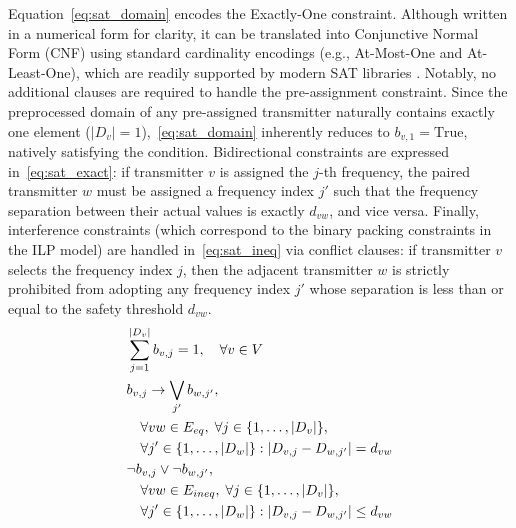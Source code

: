 \documentclass[letterpaper,journal]{IEEEtran}
\begin{document}
Equation~\eqref{eq:sat_domain} encodes the Exactly-One constraint. Although written in a numerical form for clarity, it can be translated into Conjunctive Normal Form (CNF) using standard cardinality encodings (e.g., At-Most-One and At-Least-One), which are readily supported by modern SAT libraries \cite{imms-sat18, itk-sat24}.
Notably, no additional clauses are required to handle the pre-assignment constraint. Since the preprocessed domain of any pre-assigned transmitter naturally contains exactly one element ($|D_v| = 1$),~\eqref{eq:sat_domain} inherently reduces to $b_{v,1} = \text{True}$, natively satisfying the condition. 
Bidirectional constraints are expressed in~\eqref{eq:sat_exact}: if transmitter $v$ is assigned the $j$-th frequency, the paired transmitter $w$ must be assigned a frequency index $j'$ such that the frequency separation between their actual values is exactly $d_{vw}$, and vice versa. 
Finally, interference constraints (which correspond to the binary packing constraints in the ILP model) are handled in~\eqref{eq:sat_ineq} via conflict clauses: if transmitter $v$ selects the frequency index $j$, then the adjacent transmitter $w$ is strictly prohibited from adopting any frequency index $j'$ whose separation is less than or equal to the safety threshold $d_{vw}$.
 \begin{align}
    & \sum_{j=1}^{|D_v|} b_{v,j} = 1, \quad \forall v \in V \label{eq:sat_domain} \\
    & b_{v,j} \rightarrow \bigvee_{j'} b_{w,j'}, \notag \\
    & \quad \forall vw \in E_{eq}, \; \forall j \in \{1, \dots, |D_v|\}, \notag \\
    & \quad \forall j' \in \{1, \dots, |D_w|\} : |D_{v,j} - D_{w,j'}| = d_{vw} \label{eq:sat_exact} \\
    & \neg b_{v,j} \vee \neg b_{w,j'}, \notag \\
    & \quad \forall vw \in E_{ineq}, \; \forall j \in \{1, \dots, |D_v|\}, \notag \\
    & \quad \forall j' \in \{1, \dots, |D_w|\} : |D_{v,j} - D_{w,j'}| \le d_{vw} \label{eq:sat_ineq}
\end{align}
\end{document}

